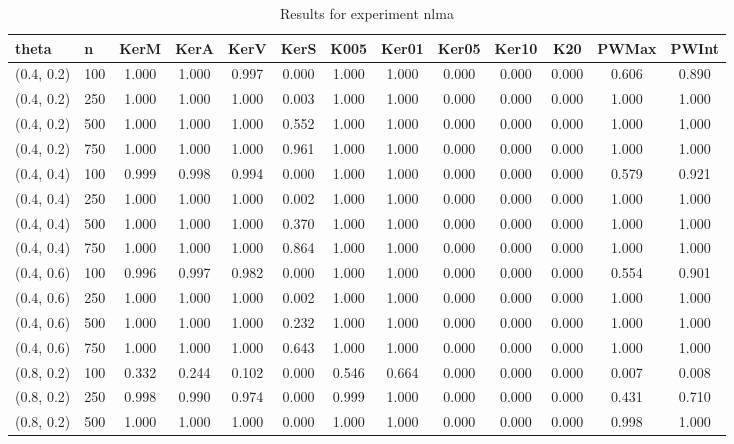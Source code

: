 \begin{table}[ht]
	\centering
	
	\caption{Results for experiment nlma}
	\tiny{
		\begin{tabular}{ll|ccccccccccc}
			\hline
			theta & n & KerM & KerA & KerV & KerS & K005 & Ker01 & Ker05 & Ker10 & K20 & PWMax & PWInt \\
			\hline
			(0.4, 0.2) & 100 & 1.000 & 1.000 & 0.997 & 0.000 & 1.000 & 1.000 & 0.000 & 0.000 & 0.000 & 0.606 & 0.890 \\
			(0.4, 0.2) & 250 & 1.000 & 1.000 & 1.000 & 0.003 & 1.000 & 1.000 & 0.000 & 0.000 & 0.000 & 1.000 & 1.000 \\
			(0.4, 0.2) & 500 & 1.000 & 1.000 & 1.000 & 0.552 & 1.000 & 1.000 & 0.000 & 0.000 & 0.000 & 1.000 & 1.000 \\
			(0.4, 0.2) & 750 & 1.000 & 1.000 & 1.000 & 0.961 & 1.000 & 1.000 & 0.000 & 0.000 & 0.000 & 1.000 & 1.000 \\
			(0.4, 0.4) & 100 & 0.999 & 0.998 & 0.994 & 0.000 & 1.000 & 1.000 & 0.000 & 0.000 & 0.000 & 0.579 & 0.921 \\
			(0.4, 0.4) & 250 & 1.000 & 1.000 & 1.000 & 0.002 & 1.000 & 1.000 & 0.000 & 0.000 & 0.000 & 1.000 & 1.000 \\
			(0.4, 0.4) & 500 & 1.000 & 1.000 & 1.000 & 0.370 & 1.000 & 1.000 & 0.000 & 0.000 & 0.000 & 1.000 & 1.000 \\
			(0.4, 0.4) & 750 & 1.000 & 1.000 & 1.000 & 0.864 & 1.000 & 1.000 & 0.000 & 0.000 & 0.000 & 1.000 & 1.000 \\
			(0.4, 0.6) & 100 & 0.996 & 0.997 & 0.982 & 0.000 & 1.000 & 1.000 & 0.000 & 0.000 & 0.000 & 0.554 & 0.901 \\
			(0.4, 0.6) & 250 & 1.000 & 1.000 & 1.000 & 0.002 & 1.000 & 1.000 & 0.000 & 0.000 & 0.000 & 1.000 & 1.000 \\
			(0.4, 0.6) & 500 & 1.000 & 1.000 & 1.000 & 0.232 & 1.000 & 1.000 & 0.000 & 0.000 & 0.000 & 1.000 & 1.000 \\
			(0.4, 0.6) & 750 & 1.000 & 1.000 & 1.000 & 0.643 & 1.000 & 1.000 & 0.000 & 0.000 & 0.000 & 1.000 & 1.000 \\
			(0.8, 0.2) & 100 & 0.332 & 0.244 & 0.102 & 0.000 & 0.546 & 0.664 & 0.000 & 0.000 & 0.000 & 0.007 & 0.008 \\
			(0.8, 0.2) & 250 & 0.998 & 0.990 & 0.974 & 0.000 & 0.999 & 1.000 & 0.000 & 0.000 & 0.000 & 0.431 & 0.710 \\
			(0.8, 0.2) & 500 & 1.000 & 1.000 & 1.000 & 0.000 & 1.000 & 1.000 & 0.000 & 0.000 & 0.000 & 0.998 & 1.000 \\

\end{tabular}}
\end{table}
